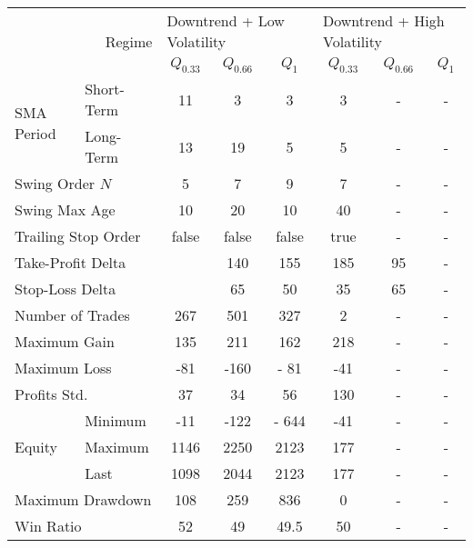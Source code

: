 \centering
\begin{tabular}{ll|cccccc}
    \toprule
    \multicolumn{2}{r|}{\multirow{2}{*}{Regime}} & \multicolumn{3}{l}{Downtrend + Low Volatility}   & \multicolumn{3}{l}{Downtrend + High Volatility}   \\
    \multicolumn{2}{r|}{} & $Q_{0.33}$ & $Q_{0.66}$ & $Q_{1}$ & $Q_{0.33}$ & $Q_{0.66}$ & $Q_{1}$ \\
    \midrule
    \multirow{2}{*}{SMA Period}            & Short-Term & 11   & 3    & 3     & 3   & - & - \\
    & Long-Term  & 13   & 19   & 5     & 5   & - & - \\
    \multicolumn{2}{l|}{Swing Order $N$} & 5 & 7 & 9 & 7 & - & - \\
    \multicolumn{2}{l|}{Swing Max Age} & 10 & 20 & 10 & 40 & - & - \\
    \multicolumn{2}{l|}{Trailing Stop Order} & false & false & false & true & - & - \\
    \multicolumn{2}{l|}{Take-Profit Delta} &            & 140  & 155  & 185   & 95  & - & - \\
    \multicolumn{2}{l|}{Stop-Loss Delta}   &            & 65   & 50   & 35    & 65  & - & - \\
    \midrule
    \multicolumn{2}{l|}{Number of Trades} & 267 & 501 & 327 & 2 & - & - \\
    \multicolumn{2}{l|}{Maximum Gain} & 135 & 211 & 162 & 218 & - & - \\
    \multicolumn{2}{l|}{Maximum Loss} & -81 & -160 & - 81 & -41 & - & - \\
    \multicolumn{2}{l|}{Profits Std.} & 37 & 34 & 56 & 130 & - & - \\
    \multirow{3}{*}{Equity}                & Minimum    & -11  & -122 & - 644 & -41 & - & - \\
    & Maximum    & 1146 & 2250 & 2123  & 177 & - & - \\
    & Last       & 1098 & 2044 & 2123  & 177 & - & - \\
    \multicolumn{2}{l|}{Maximum Drawdown} & 108 & 259 & 836 & 0 & - & - \\
    \multicolumn{2}{l|}{Win Ratio} & 52 & 49 & 49.5 & 50 & - & - \\
    \bottomrule
\end{tabular}